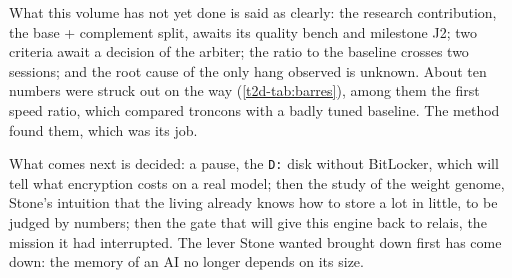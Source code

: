 What this volume has not yet done is said as clearly: the research contribution, the base + complement split, awaits its quality bench and milestone J2; two criteria await a decision of the arbiter; the ratio to the baseline crosses two sessions; and the root cause of the only hang observed is unknown. About ten numbers were struck out on the way (\cref{t2d-tab:barres}), among them the first speed ratio, which compared troncons with a badly tuned baseline. The method found them, which was its job.

What comes next is decided: a pause, the \texttt{D:} disk without BitLocker, which will tell what encryption costs on a real model; then the study of the weight genome, Stone's intuition that the living already knows how to store a lot in little, to be judged by numbers; then the gate that will give this engine back to relais, the mission it had interrupted. The lever Stone wanted brought down first has come down: the memory of an AI no longer depends on its size.
